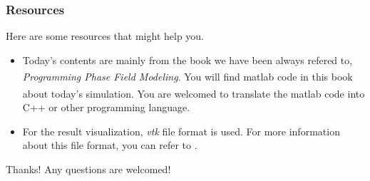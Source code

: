 \documentclass[compress,xcolor={dvipsnames}]{beamer}
\newcommand{\bhref}[2]{
    \href{#1}{\color{blue}{#2}}
}
\begin{document}
\begin{frame}
    \frametitle{Resources}

    Here are some resources that might help you.
    \begin{itemize}
        \item Today's contents are mainly from the book we have been always refered to, \emph{Programming Phase Field Modeling}. You will find matlab\textsuperscript{\textregistered} code in this book about today's simulation. You are welcomed to translate the matlab\textsuperscript{\textregistered} code into C++ or other programming language.
        \item For the result visualization, \emph{vtk} file format is used. For more information about this file format, you can refer to \bhref{https://docs.vtk.org/en/latest/design_documents/VTKFileFormats.html}{VTK file format reference}.
    \end{itemize}
\end{frame}

\begin{frame}
    \begin{center}
        {\Huge \calligra Thanks!}
        \bigbreak
        {\huge Any questions are welcomed!}
    \end{center}
\end{frame}
\end{document}
